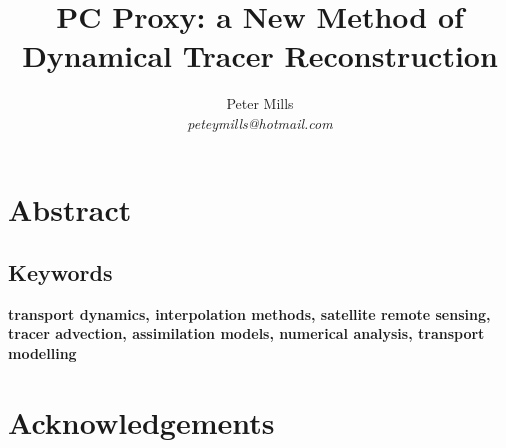 \documentclass{article}
\begin{document}
\newcommand{\vect}[1]{\ensuremath{\vec #1}}
\newcommand{\italics}[1]{{\it #1}}

\title{PC Proxy: a New Method of Dynamical Tracer Reconstruction}

\author{Peter Mills\\\textit{peteymills@hotmail.com}}

\maketitle

\pagestyle{myheadings}

\section*{Abstract}



\subsection*{Keywords}
\textbf{transport dynamics, interpolation methods, satellite remote sensing, tracer advection, assimilation models, numerical analysis, transport modelling}

\tableofcontents



\section{Acknowledgements}






\appendix


\end{document}
